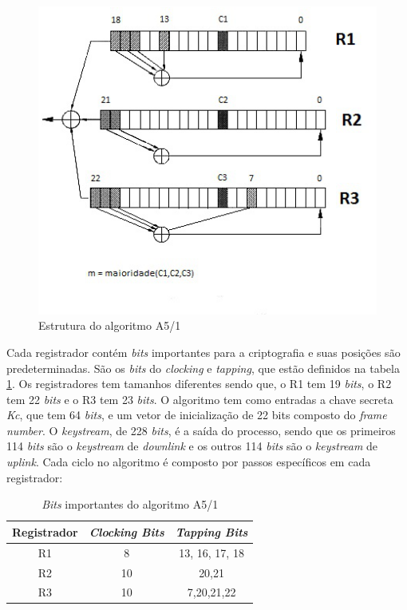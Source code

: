 \begin{figure}[h]
\centering
\includegraphics[keepaspectratio=true,scale=0.9]
    {figuras/a5_1.eps}
    \caption[Estrutura do algoritmo A5/1]{Estrutura do algoritmo A5/1\protect\footnotemark} 
\end{figure}

Cada registrador contém \textit{bits} importantes para a criptografia e suas posições são predeterminadas. São os \textit{bits} do \textit{clocking} e \textit{tapping}, que estão definidos na tabela \ref{important-bits}. Os registradores tem tamanhos diferentes sendo que, o R1 tem 19 \textit{bits}, o R2 tem 22 \textit{bits} e o R3 tem 23 \textit{bits}. O algoritmo tem como entradas a chave secreta \textit{Kc}, que tem 64 \textit{bits}, e um vetor de inicialização de 22 bits composto do \textit{frame number}. O \textit{keystream}, de 228 \textit{bits}, é a saída do processo, sendo que os primeiros 114 \textit{bits} são o \textit{keystream} de \textit{downlink} e os outros 114 \textit{bits} são o \textit{keystream} de \textit{uplink}. Cada ciclo no algoritmo é composto por passos específicos em cada registrador:

\begin{table}[h]
\centering
	\begin{tabular}{|c|c|c|}
		\hline
		Registrador & \textit{Clocking Bits} & \textit{Tapping Bits} \\ \hline
		R1 & 8 & 13, 16, 17, 18 \\ \hline
		R2 & 10 & 20,21 \\ \hline
		R3 & 10 & 7,20,21,22 \\ \hline	
	\end{tabular}
	\caption{\textit{Bits} importantes do algoritmo A5/1}
	\label{important-bits}
\end{table}

